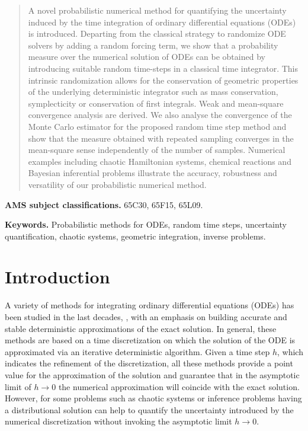 \documentclass[10pt]{article}
\begin{document}
\maketitle	

\begin{abstract} 
A novel probabilistic numerical method for  quantifying the uncertainty induced by the time integration of ordinary differential equations (ODEs) is introduced. Departing from the classical strategy to randomize ODE solvers by adding a random forcing term, we show that a probability measure over the numerical solution of ODEs can be obtained by introducing suitable random time-steps in a classical time integrator.
This  intrinsic randomization allows for the conservation of geometric properties of the underlying deterministic integrator such as mass conservation, symplecticity or conservation of first integrals. Weak and mean-square convergence analysis are derived. We also analyse the convergence of the Monte Carlo estimator for the proposed random time step method and show that the measure obtained with repeated sampling converges in the mean-square sense independently of the number of samples. Numerical examples including chaotic Hamiltonian systems, chemical reactions and Bayesian inferential problems illustrate the accuracy, robustness and versatility of our probabilistic numerical method.
\end{abstract}

\textbf{AMS subject classifications.} 65C30, 65F15, 65L09.

\textbf{Keywords.} Probabilistic methods for ODEs, random time steps, uncertainty quantification, chaotic systems, geometric integration, inverse problems.

\normalsize
\section{Introduction} 
A variety of methods for integrating ordinary differential equations (ODEs) has been studied in the last decades, \cite{HNW93, HaW96, HLW06}, with an emphasis on building accurate and stable deterministic approximations of the exact solution. In general, these methods are based on a time discretization on which the solution of the ODE is approximated via an iterative deterministic algorithm. Given a time step $h$, which indicates the refinement of the discretization, all these methods provide a point value for the approximation of the solution and guarantee that in the asymptotic limit of $h \to 0$ the numerical approximation will coincide with the exact solution. However, for some problems such as chaotic systems or inference problems having a distributional solution can help to quantify the uncertainty introduced by the numerical discretization without invoking the asymptotic limit $h \to 0$.
\end{document}
